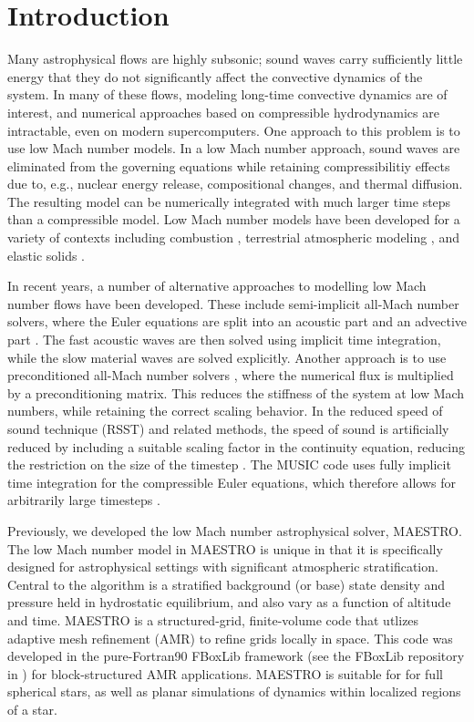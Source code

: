 \section{Introduction} \label{sec:intro}
Many astrophysical flows are highly subsonic; sound waves carry sufficiently little energy that they do not significantly affect the convective dynamics of the system.
In many of these flows, modeling long-time convective dynamics are of interest, and numerical approaches based on compressible hydrodynamics are intractable, even on modern supercomputers.
One approach to this problem is to use low Mach number models.
In a low Mach number approach, sound waves are eliminated from the governing equations while retaining compressibilitiy effects due to, e.g., nuclear energy release, compositional changes, and thermal diffusion.
The resulting model can be numerically integrated with much larger time steps than a compressible model.
Low Mach number models have been developed for a variety of contexts including combustion \citep{day2000numerical}, terrestrial atmospheric modeling \citep{duarte2015low},
and elastic solids \citep{abbate2017all}.

In recent years, a number of alternative approaches to modelling low Mach number flows have been developed. These include semi-implicit all-Mach number solvers, where the Euler equations
are split into an acoustic part and an advective part \citep{Kwatra2009,Degond2009,Cordier2012,Haack2012,Happenhofer2013,Chalons2016,Padioleau2019}. The fast acoustic waves are then
solved using implicit time integration, while the slow material waves are solved explicitly. Another approach is to use preconditioned all-Mach number solvers
\citep{Miczek2014,Barsukow2016}, where the numerical flux is multiplied by a preconditioning matrix. This reduces the stiffness of the system at low Mach numbers, while retaining the
correct scaling behavior. In the reduced speed of sound technique (RSST) and related methods, the speed of sound is artificially reduced by including a suitable scaling factor in the
continuity equation, reducing the restriction on the size of the timestep \citep{Rempel2005,Hotta2012,Wang2015,Takeyama2017,Iijima2018}. The MUSIC code uses fully implicit time integration for the compressible Euler equations, which therefore allows for arbitrarily large timesteps \citep{Viallet2011,Viallet2015,Goffrey2016}.

Previously, we developed the low Mach number astrophysical solver, MAESTRO.
The low Mach number model in MAESTRO is unique in that it is specifically designed for astrophysical settings with significant atmospheric stratification.
Central to the algorithm is a stratified background (or base) state density and pressure held in hydrostatic equilibrium, and also vary as a function of altitude and time.
MAESTRO is a structured-grid, finite-volume code that utlizes adaptive mesh refinement (AMR) to refine grids locally in space.
This code was developed in the pure-Fortran90 FBoxLib framework (see the FBoxLib repository in \cite{AMReX}) for block-structured AMR applications.
MAESTRO is suitable for for full spherical stars, as well as planar simulations of dynamics within localized regions of a star.

